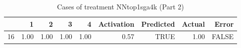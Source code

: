 \begin{table}[ht]
\centering
\begin{tabular}{rrrrrrrrr}
  \hline
 & 1 & 2 & 3 & 4 & Activation & Predicted & Actual & Error \\ 
  \hline
16 & 1.00 & 1.00 & 1.00 & 1.00 & 0.57 & TRUE & 1.00 & FALSE \\ 
   \hline
\end{tabular}
\caption{Cases of treatment NNtop1sga4k (Part 2)} 
\end{table}
